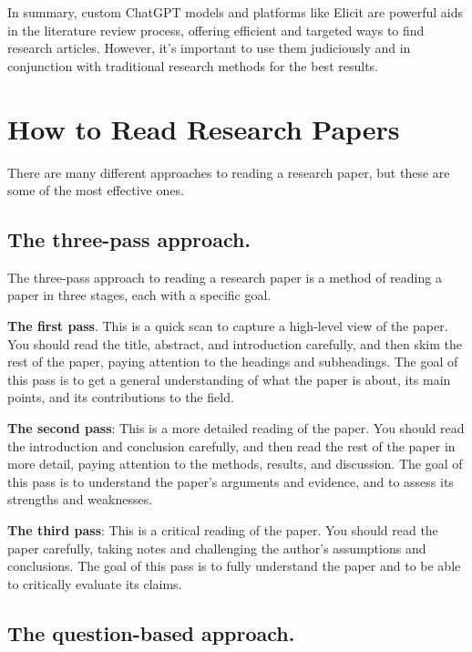 \documentclass[
]{book}
\begin{document}
In summary, custom ChatGPT models and platforms like Elicit are powerful aids in the literature review process, offering efficient and targeted ways to find research articles. However, it's important to use them judiciously and in conjunction with traditional research methods for the best results.

\hypertarget{how-to-read-research-papers}{%
\section*{How to Read Research Papers}\label{how-to-read-research-papers}}

There are many different approaches to reading a research paper, but these are some of the most effective ones.

\hypertarget{the-three-pass-approach.}{%
\subsection*{The three-pass approach.}\label{the-three-pass-approach.}}

The three-pass approach to reading a research paper is a method of reading a paper in three stages, each with a specific goal.

\textbf{The first pass}. This is a quick scan to capture a high-level view of the paper. You should read the title, abstract, and introduction carefully, and then skim the rest of the paper, paying attention to the headings and subheadings. The goal of this pass is to get a general understanding of what the paper is about, its main points, and its contributions to the field.

\textbf{The second pass}: This is a more detailed reading of the paper. You should read the introduction and conclusion carefully, and then read the rest of the paper in more detail, paying attention to the methods, results, and discussion. The goal of this pass is to understand the paper's arguments and evidence, and to assess its strengths and weaknesses.

\textbf{The third pass}: This is a critical reading of the paper. You should read the paper carefully, taking notes and challenging the author's assumptions and conclusions. The goal of this pass is to fully understand the paper and to be able to critically evaluate its claims.

\hypertarget{the-question-based-approach.}{%
\subsection*{The question-based approach.}\label{the-question-based-approach.}}
\end{document}
